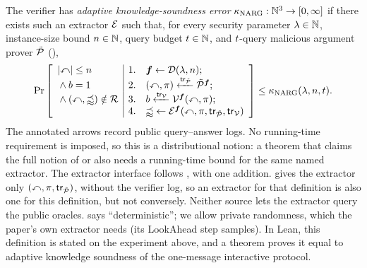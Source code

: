 \begin{definition}
  The verifier has \emph{adaptive knowledge-soundness error} \(\kappa_{\mathrm{NARG}}:\mathbb N^3\to[0,\infty]\) if there exists such an extractor \(\mathcal E\) such that, for every security parameter \(\lambda\in\mathbb N\), instance-size bound \(n\in\mathbb N\), query budget \(t\in\mathbb N\), and \(t\)-query malicious argument prover \(\tilde{\mathcal{P}}\) (),
  \begin{equation*}
    \Pr\left[\begin{array}{l|rl}
      |\mathbb{x}|\le n
        & 1. & \boldsymbol{f}\leftarrow\mathcal{D}(\lambda,n);\\
      {}\land b=1
        & 2. & (\mathbb{x},\pi)\xleftarrow{\mathsf{tr}_{\tilde{\mathcal{P}}}}\tilde{\mathcal{P}}^{\boldsymbol{f}};\\
      {}\land (\mathbb{x},\mathbb{w})\notin\mathcal{R}
        & 3. & b\xleftarrow{\mathsf{tr}_{\mathcal{V}}}\mathcal{V}^{\boldsymbol{f}}(\mathbb{x},\pi);\\
        & 4. & \mathbb{w}\leftarrow\mathcal E^{\boldsymbol{f}}
          (\mathbb{x},\pi,\mathsf{tr}_{\tilde{\mathcal{P}}},\mathsf{tr}_{\mathcal{V}})
    \end{array}\right]\le\kappa_{\mathrm{NARG}}(\lambda,n,t).
  \end{equation*}
  The annotated arrows record public query--answer logs. No running-time requirement is imposed, so this is a distributional notion: a theorem that claims the full notion of \cite{CO25} or \cite{snarg-book} also needs a running-time bound for the same named extractor.
  The extractor interface follows \cite[Definition~7.1.5]{snarg-book}, with one addition. \cite[Definition~3.6]{CO25} gives the extractor only \((\mathbb{x},\pi,\mathsf{tr}_{\tilde{\mathcal{P}}})\), without the verifier log, so an extractor for that definition is also one for this definition, but not conversely. Neither source lets the extractor query the public oracles. \cite[Definition~3.6]{CO25} says ``deterministic''; we allow private randomness, which the paper's own extractor needs (its \textsf{LookAhead} step samples).
  In Lean, this definition is stated on the experiment above, and a theorem proves it equal to adaptive knowledge soundness of the one-message interactive protocol.
  \leanok
\end{definition}
